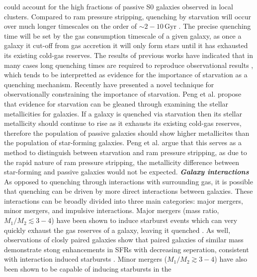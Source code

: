 could account for the high fractions of passive S0 galaxies observed
in local clusters.  Compared to ram pressure stripping, quenching by
starvation will occur over much longer timescales on the order of
$\sim 2 - 
10\,\mathrm{Gyr}$ \citep{wheeler2014, fillingham2015, peng2015,
  wetzel2015}.  The precise quenching time
will be set by the gas consumption timescale of a given galaxy, as
once a galaxy it cut-off from gas accretion it will only form stars
until it has exhausted its existing cold-gas reserves.  The results of
previous works have indicated that in many cases long quenching times
are required to reproduce observational results \citep{balogh2000,
  balogh2000b, wetzel2013, wheeler2014}, which tends to be interpretted as
evidence for the importance of starvation as a quenching mechanism.
Recently \citet{peng2015} have presented a novel technique for
observationally constraining the importance of starvation.  Peng et
al. propose that evidence for starvation can be gleaned through
examining the stellar metallicities for galaxies.  If a galaxy is
quenched via starvation then its stellar metallicity should continue
to rise as it exhausts its existing cold-gas reserves, therefore the
population of passive galaxies should show higher metallicites than
the population of star-forming galaxies.  Peng et al. argue that this
serves as a method to distinguish between starvation and ram pressure
stripping, as due to the rapid nature of ram pressure stripping, the
metallicity difference between star-forming and passive galaxies would
not be expected.\vspace{1em} \newline  
\noindent \textit{\textbf{Galaxy interactions}}
\smallskip
\newline
As opposed to quenching through interactions with surrounding gas, it
is possible that quenching can be driven by more direct interactions
between galaxies.  These interactions can be broadly divided into
three main categories: major mergers, minor mergers, and impulsive
interactions.  Major mergers (mass ratio, $M_1/M_2 \lesssim 3-4$) have
been shown to induce starburst events which can very quickly exhaust the gas
reserves of a galaxy, leaving it quenched \citep[e.g.][]{mihos1994b}.
As well, observations of closly paired galaxies show that paired
galaxies of similar mass demonstrate stong enhancements in SFRs with
decreasing seperation, consistent with interaction induced starbursts
\citep{ellison2008, davies2015}.  Minor mergers ($M_1/M_2 \gtrsim
3-4$) have also been shown to be capable of inducing starbursts in the
